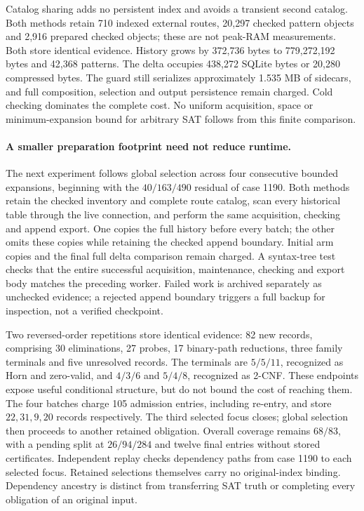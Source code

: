 \documentclass[11pt,a4paper]{article}
\numberwithin{equation}{section}
\theoremstyle{plain}
\theoremstyle{definition}
\theoremstyle{remark}
\begin{document}
Catalog sharing adds no persistent index and avoids a transient second catalog.
Both methods retain 710 indexed external routes, 20,297 checked pattern objects
and 2,916 prepared checked objects; these are not peak-RAM measurements.
Both store identical evidence. History grows by 372,736 bytes to 779,272,192
bytes and 42,368 patterns. The delta occupies 438,272 SQLite bytes or 20,280
compressed bytes. The guard still serializes approximately 1.535 MB of sidecars,
and full composition, selection and output persistence remain charged. Cold
checking dominates the complete cost. No uniform acquisition, space or
minimum-expansion bound for arbitrary SAT follows from this finite comparison.

\paragraph{A smaller preparation footprint need not reduce runtime.}
The next experiment follows global selection across four consecutive bounded
expansions, beginning with the $40/163/490$ residual of case 1190. Both methods
retain the checked inventory and complete route catalog, scan every historical
table through the live connection, and perform the same acquisition, checking
and append export. One copies the full history before every batch; the other
omits these copies while retaining the checked append boundary. Initial arm
copies and the final full delta comparison remain charged. A syntax-tree test
checks that the entire successful acquisition, maintenance, checking and export
body matches the preceding worker. Failed work is archived separately as
unchecked evidence; a rejected append boundary triggers a full backup for
inspection, not a verified checkpoint.

Two reversed-order repetitions store identical evidence: 82 new records,
comprising 30 eliminations, 27 probes, 17 binary-path reductions, three family
terminals and five unresolved records. The terminals are $5/5/11$, recognized
as Horn and zero-valid, and $4/3/6$ and $5/4/8$, recognized as 2-CNF. These
endpoints expose useful conditional structure, but do not bound the cost of
reaching them. The four batches charge 105 admission entries, including re-entry,
and store $22,31,9,20$ records respectively. The third selected focus closes;
global selection then proceeds to another retained obligation. Overall coverage
remains $68/83$, with a pending split at $26/94/284$ and twelve final entries
without stored certificates. Independent replay checks dependency paths from
case 1190 to each selected focus. Retained selections themselves carry no
original-index binding. Dependency ancestry is distinct from transferring SAT
truth or completing every obligation of an original input.
\end{document}
